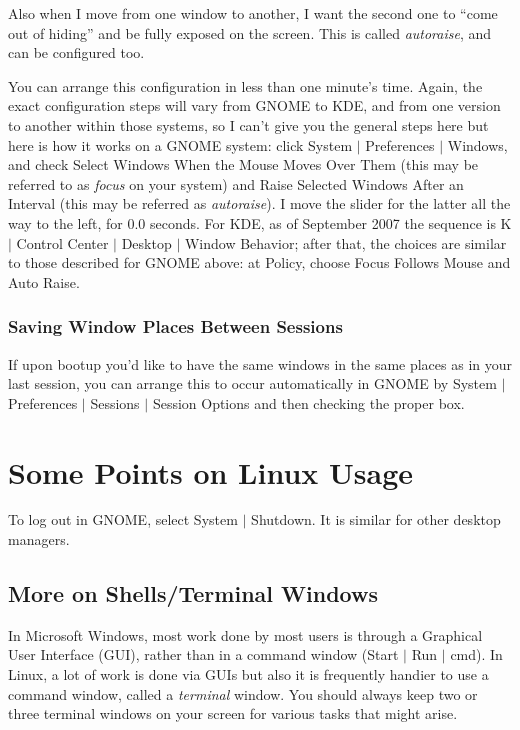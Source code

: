 \documentclass[11pt]{article}
\begin{document}
Also when I move from one window to another, I want the second one to
``come out of hiding'' and be fully exposed on the screen.  This is
called {\it autoraise}, and can be configured too.

You can arrange this configuration in less than one minute's time.
Again, the exact configuration steps will vary from GNOME to KDE, and
from one version to another within those systems, so I can't give you
the general steps here but here is how it works on a GNOME
system:  click System $|$ Preferences $|$ Windows, and check Select
Windows When the Mouse Moves Over Them (this may be referred to as {\it
focus} on your system) and Raise Selected Windows After an Interval
(this may be referred as {\it autoraise}).  I move the slider for the
latter all the way to the left, for 0.0 seconds.  For KDE, as of
September 2007 the sequence is K $|$ Control Center $|$ Desktop $|$
Window Behavior; after that, the choices are similar to those described
for GNOME above:  at Policy, choose Focus Follows Mouse and Auto Raise.

\subsubsection{Saving Window Places Between Sessions}

If upon bootup you'd like to have the same windows in the same places 
as in your last session, you can arrange this to occur automatically in
GNOME by System $|$ Preferences $|$  Sessions $|$ Session Options and
then checking the proper box.

\section{Some Points on Linux Usage}

To log out in GNOME, select System  $|$ Shutdown.  It is similar
for other desktop managers.

\subsection{More on Shells/Terminal Windows}
\label{shells}

In Microsoft Windows, most work done by most users is through a
Graphical User Interface (GUI), rather than in a command window (Start
$|$ Run $|$ cmd).  In Linux, a lot of work is done via GUIs but also it
is frequently handier to use a command window, called a {\it terminal}
window.  You should always keep two or three terminal windows on your
screen for various tasks that might arise.  
\end{document}
